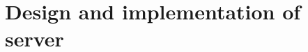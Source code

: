 \documentclass[Main]{subfiles}
\begin{document}
\section{Design and implementation of server}





\newpage



\end{document}

